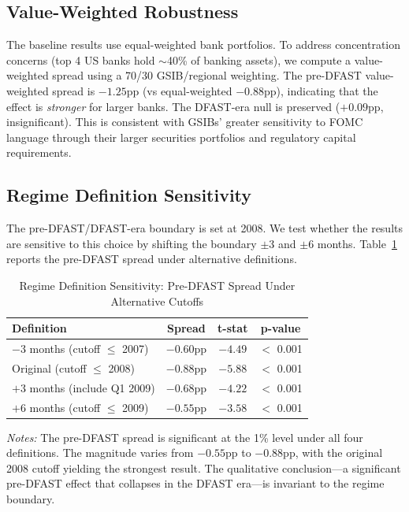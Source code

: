 \documentclass[12pt,a4paper]{article}
\begin{document}
\subsection{Value-Weighted Robustness}

The baseline results use equal-weighted bank portfolios. To address concentration concerns (top 4 US banks hold $\sim$40\% of banking assets), we compute a value-weighted spread using a 70/30 GSIB/regional weighting. The pre-DFAST value-weighted spread is $-1.25$pp (vs equal-weighted $-0.88$pp), indicating that the effect is \textit{stronger} for larger banks. The DFAST-era null is preserved ($+0.09$pp, insignificant). This is consistent with GSIBs' greater sensitivity to FOMC language through their larger securities portfolios and regulatory capital requirements.

\subsection{Regime Definition Sensitivity}

The pre-DFAST/DFAST-era boundary is set at 2008. We test whether the results are sensitive to this choice by shifting the boundary $\pm$3 and $\pm$6 months. Table~\ref{tab:regime_sens} reports the pre-DFAST spread under alternative definitions.

\begin{table}[H]
\centering
\caption{Regime Definition Sensitivity: Pre-DFAST Spread Under Alternative Cutoffs}
\label{tab:regime_sens}
\small
\begin{tabular}{lccc}
\toprule
Definition & Spread & t-stat & p-value \\
\midrule
$-3$ months (cutoff $\leq$ 2007) & $-0.60$pp & $-4.49$ & $<$ 0.001 \\
Original (cutoff $\leq$ 2008) & $-0.88$pp & $-5.88$ & $<$ 0.001 \\
$+3$ months (include Q1 2009) & $-0.68$pp & $-4.22$ & $<$ 0.001 \\
$+6$ months (cutoff $\leq$ 2009) & $-0.55$pp & $-3.58$ & $<$ 0.001 \\
\bottomrule
\end{tabular}
\end{table}
\noindent\textit{Notes:} The pre-DFAST spread is significant at the 1\% level under all four definitions. The magnitude varies from $-0.55$pp to $-0.88$pp, with the original 2008 cutoff yielding the strongest result. The qualitative conclusion---a significant pre-DFAST effect that collapses in the DFAST era---is invariant to the regime boundary.
\end{document}
